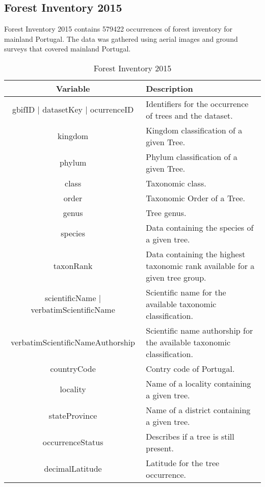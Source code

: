 \subsection{Forest Inventory 2015 \cite{uva2021forestry,https://doi.org/10.15468/dl.zwfmbt}}
Forest Inventory 2015 contains 579422 occurrences of forest inventory for mainland Portugal. The data was gathered using aerial images and ground surveys that covered mainland Portugal. 
\begin{table}[h!]
\caption{Forest Inventory 2015}
\label{forest_inventory}
\centering
\small
\begin{tabular}{|c|p{7.5cm}|} %
\hline
\textbf{Variable} & \textbf{Description}\\
\hline
gbifID | datasetKey | ocurrenceID  & Identifiers for the occurrence of trees and the dataset. \\
\hline
kingdom & Kingdom classification of a given Tree. \\
\hline
phylum & Phylum classification of a given Tree. \\
\hline
class & Taxonomic class. \\
\hline
order & Taxonomic Order of a Tree. \\
\hline
genus & Tree genus. \\
\hline
species & Data containing the species of a given tree. \\
\hline
taxonRank & Data containing the highest taxonomic rank available for a given tree group. \\
\hline
scientificName | verbatimScientificName & Scientific name for the available taxonomic classification. \\
\hline

verbatimScientificNameAuthorship & Scientific name authorship for the available taxonomic classification. \\
\hline

countryCode & Contry code of Portugal. \\
\hline

locality & Name of a locality containing a given tree. \\
\hline

stateProvince &  Name of a district containing a given tree. \\
\hline

occurrenceStatus & Describes if a tree is still present.   \\
\hline

decimalLatitude & Latitude for the tree occurrence. \\
\hline


\end{tabular}
\end{table}
